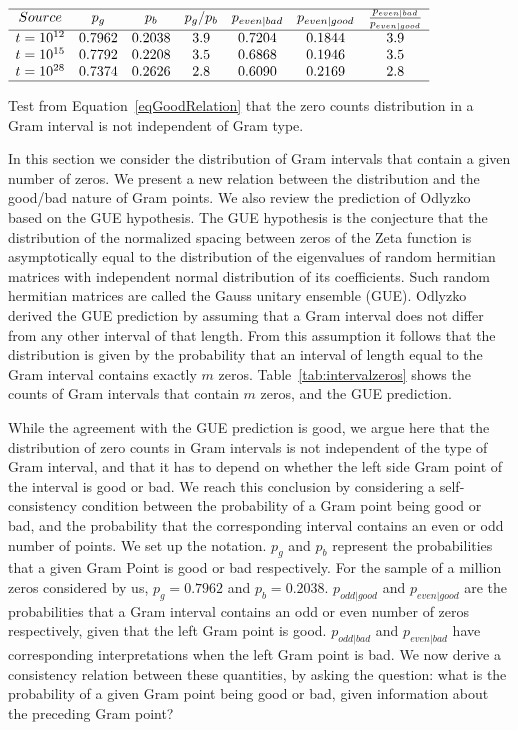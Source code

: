 \documentclass[twoside]{article}
\begin{document}
\begin{table}
\centering \(\begin{array}{ccccccc}
\hline
Source &p_g&p_b& p_g/p_b&p_{even|bad} &p_{even|good}&\frac{p_{even|bad}}{p_{even|good}}\\
\hline
t = 10^{12}&0.7962&0.2038&3.9&0.7204&0.1844&3.9\\
t = 10^{15}&0.7792&0.2208&3.5&0.6868&0.1946&3.5\\
t = 10^{28}&0.7374&0.2626&2.8&0.6090&0.2169&2.8\\
\hline
\end{array}\)
\caption{Test from  Equation~\ref{eqGoodRelation} that the zero counts distribution in a Gram interval is not independent of Gram type.} \label{tab:pevenpred}
\end{table}

In this section we consider the distribution of Gram intervals that contain a given number of zeros. We present a new relation between the distribution and the good/bad nature of Gram points. We also review the prediction of Odlyzko~\cite{Odlyzko(1992)} based on the GUE hypothesis. The GUE hypothesis  is the conjecture that the distribution of the normalized spacing between zeros of the Zeta function is asymptotically equal to the distribution of the eigenvalues of random hermitian matrices with independent normal distribution of its coefficients. Such random hermitian matrices are called the Gauss unitary ensemble (GUE).  Odlyzko derived the GUE prediction by assuming that a Gram interval does not differ from any other interval of that length. From this assumption it follows that the distribution is given by the probability that an interval of length equal to the Gram interval contains exactly $m$ zeros. Table~\ref{tab:intervalzeros} shows the counts of Gram intervals that contain $m$ zeros, and the GUE prediction.

While the agreement with the GUE prediction is good, we argue here that the distribution of zero counts in Gram intervals is not independent of the type of Gram interval, and that it has to depend on whether the left side Gram point of the interval is good or bad. We reach this conclusion by considering a self-consistency condition between the probability of a Gram point being good or bad, and the probability that the corresponding interval contains an even or odd number of points.  We set up the notation. $p_g$ and $p_b$ represent the probabilities that a given Gram Point is good or bad respectively. For the sample of a million zeros considered by us,  $p_g = 0.7962$ and $p_b = 0.2038$. $p_{odd|good}$ and $p_{even|good}$ are the probabilities that a Gram interval contains an odd or even number of zeros respectively, given that the left Gram point is good. $p_{odd|bad}$ and $p_{even|bad}$ have corresponding interpretations when the left Gram point is bad. We now derive a consistency relation between these quantities, by asking the question: what is the probability of a given Gram point being good or bad, given information about the preceding Gram point? 
\end{document}
